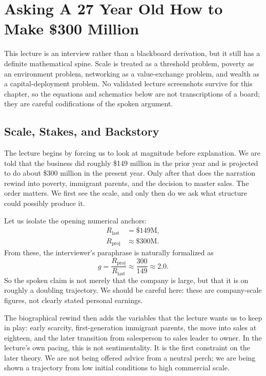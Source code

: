 \chapter{Asking A 27 Year Old How to Make \$300 Million}

This lecture is an interview rather than a blackboard derivation, but it still has a definite mathematical spine. Scale is treated as a threshold problem, poverty as an environment problem, networking as a value-exchange problem, and wealth as a capital-deployment problem. No validated lecture screenshots survive for this chapter, so the equations and schematics below are not transcriptions of a board; they are careful codifications of the spoken argument.

\section{Scale, Stakes, and Backstory}

The lecture begins by forcing us to look at magnitude before explanation. We are told that the business did roughly \$149 million in the prior year and is projected to do about \$300 million in the present year. Only after that does the narration rewind into poverty, immigrant parents, and the decision to master sales. The order matters. We first see the scale, and only then do we ask what structure could possibly produce it.

Let us isolate the opening numerical anchors:
\begin{align}
R_{\text{last}} &= \$149\text{M},\\
R_{\text{proj}} &\approx \$300\text{M}.
\end{align}
From these, the interviewer's paraphrase is naturally formalized as
\begin{equation}
g=\frac{R_{\text{proj}}}{R_{\text{last}}}\approx \frac{300}{149}\approx 2.0.
\end{equation}
So the spoken claim is not merely that the company is large, but that it is on roughly a doubling trajectory. We should be careful here: these are company-scale figures, not clearly stated personal earnings.

The biographical rewind then adds the variables that the lecture wants us to keep in play: early scarcity, first-generation immigrant parents, the move into sales at eighteen, and the later transition from salesperson to sales leader to owner. In the lecture's own pacing, this is not sentimentality. It is the first constraint on the later theory. We are not being offered advice from a neutral perch; we are being shown a trajectory from low initial conditions to high commercial scale.

